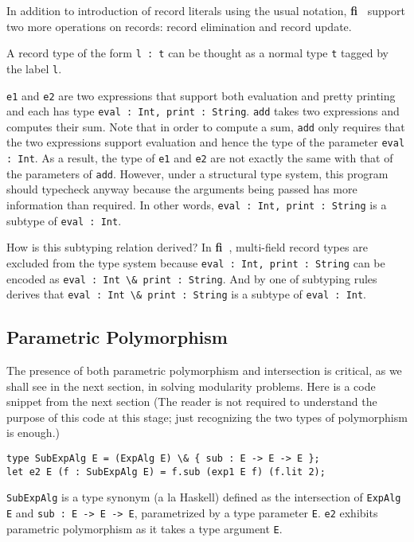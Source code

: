 \documentclass[preprint]{sigplanconf}
\newcommand{\name}{{\bf fi~}}
\newcommand{\Target}{{\bf f}}
\begin{document}
In addition to introduction of record literals using the usual notation, \name
support two more operations on records: record elimination and record update.

A record type of the form \lstinline{l : t} can be thought as a normal type \lstinline{t}
tagged by the label \lstinline{l}.



\lstinline{e1} and \lstinline{e2} are two expressions that support both evaluation and pretty
printing and each has type \lstinline{eval : Int, print : String}. \lstinline{add} takes
two expressions and computes their sum. Note that in order to compute a sum,
\lstinline{add} only requires that the two expressions support evaluation and hence the
type of the parameter \lstinline{eval : Int}. As a result, the type of \lstinline{e1} and
\lstinline{e2} are not exactly the same with that of the parameters of \lstinline{add}. However,
under a structural type system, this program should typecheck anyway because the
arguments being passed has more information than required. In other words,
\lstinline{eval : Int, print : String} is a subtype of \lstinline{eval : Int}.

How is this subtyping relation derived? In \name, multi-field record types are
excluded from the type system because \lstinline{eval : Int, print : String} can
be encoded as \lstinline{eval : Int \& print : String}. And by one of
subtyping rules derives that \lstinline{eval : Int \& print : String} is a
subtype of \lstinline{eval : Int}.



\subsection{Parametric Polymorphism}

The presence of both parametric polymorphism and intersection is critical, as we
shall see in the next section, in solving modularity problems. Here is a code
snippet from the next section (The reader is not required to understand the
purpose of this code at this stage; just recognizing the two types of
polymorphism is enough.)
\begin{lstlisting}
type SubExpAlg E = (ExpAlg E) \& { sub : E -> E -> E };
let e2 E (f : SubExpAlg E) = f.sub (exp1 E f) (f.lit 2);
\end{lstlisting}
\lstinline{SubExpAlg} is a type synonym (a la Haskell) defined as the intersection of
\lstinline{ExpAlg E} and \lstinline{sub : E -> E -> E}, parametrized by a type parameter
\lstinline{E}. \lstinline{e2} exhibits parametric polymorphism as it takes a type argument
\lstinline{E}.
\end{document}
